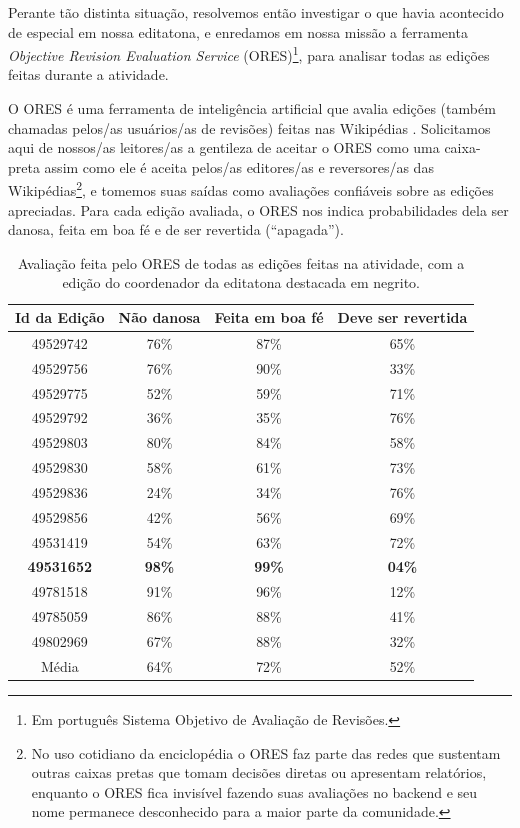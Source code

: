 Perante tão distinta situação, resolvemos então investigar o que havia acontecido de especial em nossa editatona, e enredamos em nossa missão a ferramenta \textit{Objective Revision Evaluation Service} (ORES)\footnote{Em português Sistema Objetivo de Avaliação de Revisões.}, para analisar todas as edições feitas durante a atividade.

O ORES é uma ferramenta de inteligência artificial que avalia edições (também chamadas pelos/as usuários/as de revisões) feitas nas Wikipédias \citep{halfaker_artificial_2015}. Solicitamos aqui de nossos/as leitores/as a gentileza de aceitar o ORES como uma caixa-preta assim como ele é aceita pelos/as editores/as e reversores/as das Wikipédias\footnote{No uso cotidiano da enciclopédia o ORES faz parte das redes que sustentam outras caixas pretas que tomam decisões diretas ou apresentam relatórios, enquanto o ORES fica invisível fazendo suas avaliações no backend e seu nome permanece desconhecido para a maior parte da comunidade.}, e tomemos suas saídas como avaliações confiáveis sobre as edições apreciadas. Para cada edição avaliada, o ORES nos indica probabilidades dela ser danosa, feita em boa fé e de ser revertida (``apagada'').
\begin{center}
\begin{table}[hbt]
\begin{tabular}{ |c|c|c|c| } 
 \hline
\textbf{Id da Edição} & \textbf{Não danosa} & \textbf{Feita em boa fé} & \textbf{Deve ser revertida} \\
\hline
49529742 & 76\% & 87\% & 65\% \\
\hline
49529756 & 76\% & 90\% & 33\% \\
\hline
49529775 & 52\% & 59\% & 71\% \\
\hline
49529792 & 36\% & 35\% & 76\% \\
\hline
49529803 & 80\% & 84\% & 58\% \\
\hline
49529830 & 58\% & 61\% & 73\% \\
\hline
49529836 & 24\% & 34\% & 76\% \\
\hline
49529856 & 42\% & 56\% & 69\% \\
\hline
49531419 & 54\% & 63\% & 72\% \\
\hline
\textbf{49531652} & \textbf{98\%} & \textbf{99\%} & \textbf{04\%} \\
\hline
49781518 & 91\% & 96\% & 12\% \\
\hline
49785059 & 86\% & 88\% & 41\% \\
\hline
49802969 & 67\% & 88\% & 32\% \\
\hline
Média & 64\% & 72\% & 52\% \\
 \hline
\end{tabular}
\caption{Avaliação feita pelo ORES de todas as edições feitas na atividade, com a edição do coordenador da editatona destacada em negrito.}
\label{table:avaliacao-ores}
\end{table}
\end{center}
